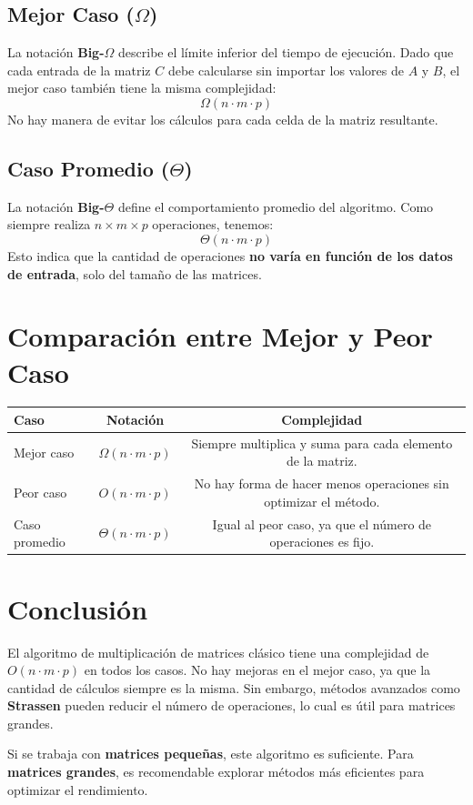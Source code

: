 \documentclass{article}
\begin{document}
	\subsection*{Mejor Caso (\(\Omega\))}
	La notación \textbf{Big-\(\Omega\)} describe el límite inferior del tiempo de ejecución. Dado que cada entrada de la matriz \( C \) debe calcularse sin importar los valores de \( A \) y \( B \), el mejor caso también tiene la misma complejidad:
	\[
	\Omega(n \cdot m \cdot p)
	\]
	No hay manera de evitar los cálculos para cada celda de la matriz resultante.
	
	\subsection*{Caso Promedio (\(\Theta\))}
	La notación \textbf{Big-\(\Theta\)} define el comportamiento promedio del algoritmo. Como siempre realiza \( n \times m \times p \) operaciones, tenemos:
	\[
	\Theta(n \cdot m \cdot p)
	\]
	Esto indica que la cantidad de operaciones \textbf{no varía en función de los datos de entrada}, solo del tamaño de las matrices.
	
	\section{Comparación entre Mejor y Peor Caso}
	\begin{center}
		\begin{tabular}{ l c c }
			\toprule
			\textbf{Caso} & \textbf{Notación} & \textbf{Complejidad} \\
			\midrule
			Mejor caso & \(\Omega(n \cdot m \cdot p)\) & Siempre multiplica y suma para cada elemento de la matriz. \\
			Peor caso & \(O(n \cdot m \cdot p)\) & No hay forma de hacer menos operaciones sin optimizar el método. \\
			Caso promedio & \(\Theta(n \cdot m \cdot p)\) & Igual al peor caso, ya que el número de operaciones es fijo. \\
			\bottomrule
		\end{tabular}
	\end{center}
	

	
	\section{Conclusión}
	El algoritmo de multiplicación de matrices clásico tiene una complejidad de \( O(n \cdot m \cdot p) \) en todos los casos. No hay mejoras en el mejor caso, ya que la cantidad de cálculos siempre es la misma. Sin embargo, métodos avanzados como \textbf{Strassen} pueden reducir el número de operaciones, lo cual es útil para matrices grandes.
	
	Si se trabaja con \textbf{matrices pequeñas}, este algoritmo es suficiente. Para \textbf{matrices grandes}, es recomendable explorar métodos más eficientes para optimizar el rendimiento.
	
	
\end{document}
